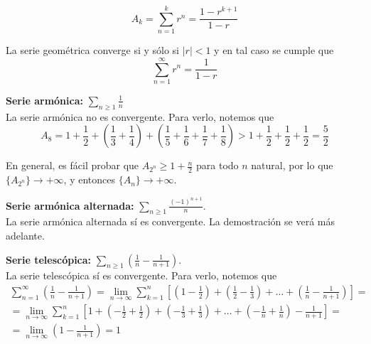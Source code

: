 \begin{equation*}
    A_k = \displaystyle\sum_{n = 1}^{k} r^n = \frac{1-r^{k+1}}{1-r}
\end{equation*}

La serie geométrica converge si y sólo si $|r| < 1$ y en tal caso se cumple que
\begin{equation*}
    \sum_{n = 1}^{\infty} r^n = \frac{1}{1-r}
\end{equation*}

\newpage
\vspace{0.5cm}\noindent\textbf{Serie armónica:}
$\displaystyle \sum_{n \geq 1} \frac{1}{n}$\\

La serie armónica no es convergente. Para verlo, notemos que
\begin{equation*}
    A_8 = 1+\frac{1}{2}+\left(\frac{1}{3}+\frac{1}{4}\right)+\left(\frac{1}{5}+\frac{1}{6}+\frac{1}{7}+\frac{1}{8}\right) > 1+\frac{1}{2}+\frac{1}{2}+\frac{1}{2} = \frac{5}{2}
\end{equation*}

En general, es fácil probar que $A_{2^n} \geq 1 + \frac{n}{2}$ para todo $n$ natural, por lo que
$\{A_{2^n}\} \longrightarrow +\infty$, y entonces $\{A_n\} \longrightarrow +\infty$.

\vspace{0.5cm}\noindent\textbf{Serie armónica alternada:} $\displaystyle\sum_{n \geq 1} \frac{(-1)^{n+1}}{n}$.\\

La serie armónica alternada sí es convergente. La demostración se verá más adelante.

\vspace{0.5cm}\noindent\textbf{Serie telescópica:} $\displaystyle\sum_{n \geq 1} \left(\frac{1}{n} - \frac{1}{n+1}\right)$.\\

La serie telescópica sí es convergente. Para verlo, notemos que
\begin{multline*}
    \displaystyle\sum_{n = 1}^{\infty} \left(\frac{1}{n} - \frac{1}{n+1}\right) = \lim_{n \to \infty} \displaystyle\sum_{k = 1}^{n} \left[ \left(1 - \frac{1}{2}\right) + \left(\frac{1}{2} - \frac{1}{3}\right) + \dots + \left(\frac{1}{n} - \frac{1}{n+1}\right)\right]=\\
    = \lim_{n \to \infty} \displaystyle\sum_{k = 1}^{n} \left[ 1 + \left(-\frac{1}{2} + \frac{1}{2}\right) + \left(-\frac{1}{3} + \frac{1}{3}\right) + \dots + \left(-\frac{1}{n} + \frac{1}{n}\right) - \frac{1}{n+1}\right] =\\
    =\lim_{n \to \infty} \left( 1- \frac{1}{n+1} \right) = 1
\end{multline*}

